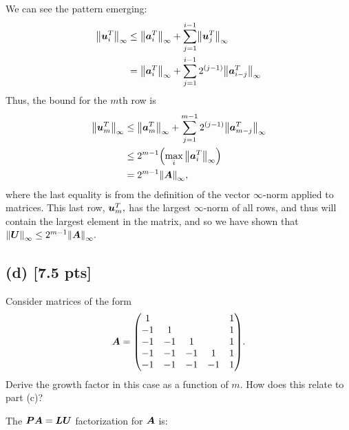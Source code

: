\documentclass[twoside,10pt]{article}
\begin{document}
We can see the pattern emerging:
\begin{align*}
\left\|\vct{u}_i^T\right\|_{\infty} &\leq \left\|\mtx{a}^T_{i}\right\|_{\infty} +\sum_{j=1}^{i-1} \left\|\mtx{u}^T_{j}\right\|_{\infty}\\
&= \left\|\mtx{a}^T_{i}\right\|_{\infty} + \sum_{j=1}^{i-1}{2^{(j-1)}\left\|\mtx{a}^T_{i-j}\right\|_{\infty}}\\
\end{align*}
Thus, the bound for the $m$th row is
\begin{align*}
  \left\|\vct{u}_m^T\right\|_{\infty} &\leq \left\|\mtx{a}^T_{m}\right\|_{\infty} + \sum_{j=1}^{m-1}{2^{(j-1)}\left\|\mtx{a}^T_{m-j}\right\|_{\infty}}\\
  &\leq 2^{m - 1}\left(\max_i{\left\|\mtx{a}^T_{i}\right\|_{\infty}}\right)\\
  &=2^{m - 1}\left\| \mtx{A}\right\|_{\infty},
\end{align*}
where the last equality is from the definition of the vector $\infty$-norm applied to matrices.
This last row, $\bm{u}_m^T,$ has the largest $\infty$-norm of all rows, and thus will contain the largest element in the matrix, and so we have shown that $\left\|\mtx{U}\right\|_{\infty} \leq 2^{m - 1} \left\| \mtx{A}\right\|_{\infty}.$

\subsection*{(d) [7.5 pts]} Consider matrices of the form 
\begin{equation}
  \mtx{A} = 
  \begin{pmatrix}
    1  &    &   &       & 1 \\
    -1 & 1  &   &       & 1 \\
    -1 & -1 & 1 &       & 1 \\
    -1 & -1 & -1 &    1 & 1 \\
    -1 & -1 & -1 &  - 1 & 1 
  \end{pmatrix}.
\end{equation}
Derive the growth factor in this case as a function of $m$.
How does this relate to part (c)? 

The $\bm{P}\bm{A} = \bm{L}\bm{U}$ factorization for $\bm{A}$ is:
\end{document}
